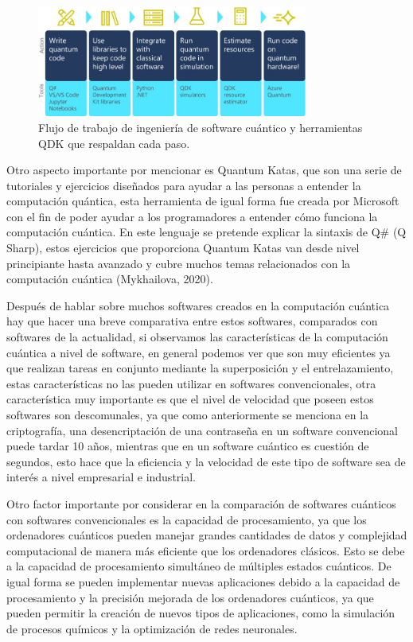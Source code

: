 \documentclass{article}
\begin{document}
\begin{figure}[htb]
    \centering
    \includegraphics[width=3.5in]{QDK.jpg}
    \caption{Flujo de trabajo de ingeniería de software cuántico y herramientas QDK que respaldan cada paso.}
    \label{fig:quantum}
\end{figure}

Otro aspecto importante por mencionar es Quantum Katas, que son una serie de tutoriales y ejercicios diseñados para ayudar a las personas a entender la computación quántica, esta herramienta de igual forma fue creada por Microsoft con el fin de poder ayudar a los programadores a entender cómo funciona la computación cuántica. En este lenguaje se pretende explicar la sintaxis de Q\# (Q Sharp), estos ejercicios que proporciona Quantum Katas van desde nivel principiante hasta avanzado y cubre muchos temas relacionados con la computación cuántica (Mykhailova, 2020).

Después de hablar sobre muchos softwares creados en la computación cuántica hay que hacer una breve comparativa entre estos softwares, comparados con softwares de la actualidad, si observamos las características de la computación cuántica a nivel de software, en general podemos ver que son muy eficientes ya que realizan tareas en conjunto mediante la superposición y el entrelazamiento, estas características no las pueden utilizar en softwares convencionales, otra característica muy importante es que el nivel de velocidad que poseen estos softwares son descomunales, ya que como anteriormente se menciona en la criptografía, una desencriptación de una contraseña en un software convencional puede tardar 10 años, mientras que en un software cuántico es cuestión de segundos, esto hace que la eficiencia y la velocidad de este tipo de software sea de interés a nivel empresarial e industrial. 

Otro factor importante por considerar en la comparación de softwares cuánticos con softwares convencionales es la capacidad de procesamiento, ya que los ordenadores cuánticos pueden manejar grandes cantidades de datos y complejidad computacional de manera más eficiente que los ordenadores clásicos. Esto se debe a la capacidad de procesamiento simultáneo de múltiples estados cuánticos. De igual forma se pueden implementar nuevas aplicaciones debido a la capacidad de procesamiento y la precisión mejorada de los ordenadores cuánticos, ya que pueden permitir la creación de nuevos tipos de aplicaciones, como la simulación de procesos químicos y la optimización de redes neuronales. 
\end{document}
